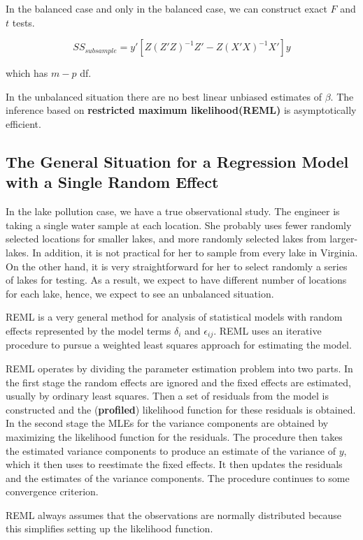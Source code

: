 \documentclass[12pt]{article}
\begin{document}
In the balanced case and only in the balanced case, we can construct exact $F$ and $t$ tests.

$$
SS_{subsample} = y' [Z(Z'Z)^{-1}Z' - Z(X'X)^{-1}X']y
$$

which has $m-p$ df.

In the unbalanced situation there are no best linear unbiased estimates of $\beta$. The inference based on \textbf{restricted maximum likelihood(REML)} is asymptotically efficient.


\subsection{The General Situation for a Regression Model with a Single Random Effect}

In the lake pollution case, we have a true observational study. The engineer is taking a single water sample at each location. She probably uses fewer randomly selected locations for smaller lakes, and more randomly selected lakes from larger-lakes. In addition, it is not practical for her to sample from every lake in Virginia. On the other hand, it is very straightforward for her to select randomly a series of lakes for testing. As a result, we expect to have different number of locations for each lake, hence, we expect to see an unbalanced situation.


REML is a very general method for analysis of statistical models with random effects represented by the model terms $\delta_i$ and $\epsilon_{ij}$. REML uses an iterative procedure to pursue a weighted least squares approach for estimating the model.

REML operates by dividing the parameter estimation problem into two parts. In the first stage the random effects are ignored and the fixed effects are estimated, usually by ordinary least squares. Then a set of residuals from the model is constructed and the (\textbf{profiled}) likelihood function for these residuals is obtained. In the second stage the MLEs for the variance components are obtained by maximizing the likelihood function for the residuals. The procedure then takes the estimated variance components to produce an estimate of the variance of $y$, which it then uses to reestimate the fixed effects. It then updates the residuals and the estimates of the variance components. The procedure continues to some convergence criterion.

REML always assumes that the observations are normally distributed because this simplifies setting up the likelihood function.
\end{document}
